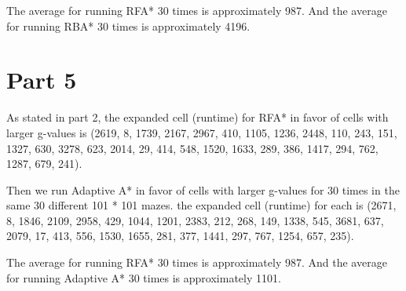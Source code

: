 \documentclass{article}
\begin{document}
The average for running RFA* 30 times is approximately 987. And the average for running RBA* 30 times is approximately 4196.

\section*{Part 5}
\hspace{5mm}
As stated in part 2, the expanded cell (runtime) for RFA* in favor of cells with larger g-values is
(2619, 8, 1739, 2167, 2967, 410, 1105, 1236, 2448, 110, 243, 151, 1327, 630, 3278, 623, 2014, 29, 414, 548, 1520, 1633, 289, 386, 1417, 294, 762, 1287, 679, 241).

Then we run Adaptive A* in favor of cells with larger g-values for 30 times in the same 30 different 101 * 101 mazes. the expanded cell (runtime) for each is
(2671, 8, 1846, 2109, 2958, 429, 1044, 1201, 2383, 212, 268, 149, 1338, 545, 3681, 637, 2079, 17, 413, 556, 1530, 1655, 281, 377, 1441, 297, 767, 1254, 657, 235).

The average for running RFA* 30 times is approximately 987. And the average for running Adaptive A* 30 times is approximately 1101.
\end{document}
